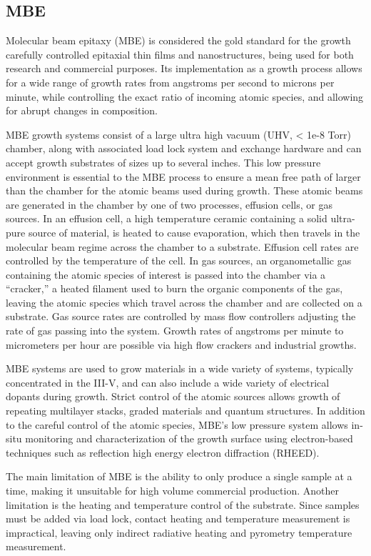\subsection{MBE} Molecular beam epitaxy (MBE) is considered the gold standard for the growth carefully controlled epitaxial thin films and nanostructures, being used for both research and commercial purposes.
Its implementation as a growth process allows for a wide range of growth rates from angstroms per second to microns per minute, while controlling the exact ratio of incoming atomic species, and allowing for abrupt changes in composition.

MBE growth systems consist of a large ultra high vacuum (UHV, < 1e-8 Torr) chamber, along with associated load lock system and exchange hardware and can accept growth substrates of sizes up to several inches.
This low pressure environment is essential to the MBE process to ensure a mean free path of larger than the chamber for the atomic beams used during growth.
These atomic beams are generated in the chamber by one of two processes, effusion cells, or gas sources.
In an effusion cell, a high temperature ceramic containing a solid ultra-pure source of material, is heated to cause evaporation, which then travels in the molecular beam regime across the chamber to a substrate.
Effusion cell rates are controlled by the temperature of the cell.
In gas sources, an organometallic gas containing the atomic species of interest is passed into the chamber via a ``cracker,'' a heated filament used to burn the organic components of the gas, leaving the atomic species which travel across the chamber and are collected on a substrate.
Gas source rates are controlled by mass flow controllers adjusting the rate of gas passing into the system.
Growth rates of angstroms per minute to micrometers per hour are possible via high flow crackers and industrial growths.

MBE systems are used to grow materials in a wide variety of systems, typically concentrated in the III-V, and can also include a wide variety of electrical dopants during growth.
Strict control of the atomic sources allows growth of repeating multilayer stacks, graded materials and quantum structures.
In addition to the careful control of the atomic species, MBE's low pressure system allows in-situ monitoring and characterization of the growth surface using electron-based techniques such as reflection high energy electron diffraction (RHEED).

The main limitation of MBE is the ability to only produce a single sample at a time, making it unsuitable for high volume commercial production.
Another limitation is the heating and temperature control of the substrate.
Since samples must be added via load lock, contact heating and temperature measurement is impractical, leaving only indirect radiative heating and pyrometry temperature measurement.
